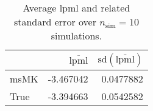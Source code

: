 \begin{table}[H]

\caption{Average lpml and related standard error over $n_{\text{sim}} = 10$ simulations.}
\centering
\begin{tabular}[t]{lrr}
\toprule
  & $\overbar{\text{lpml}}$ & $\text{sd}(\overbar{\text{lpml}})$\\
\midrule
msMK & -3.467042 & 0.0477882\\
True & -3.394663 & 0.0542582\\
\bottomrule
\end{tabular}
\end{table}